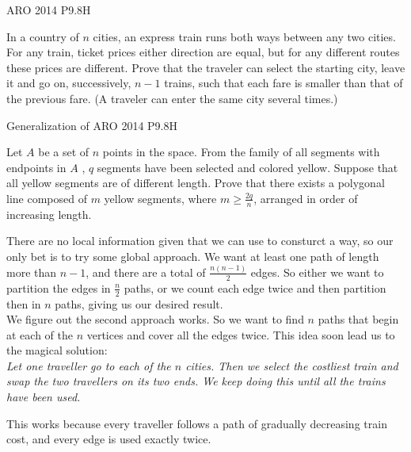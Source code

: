 

{ARO 2014 P9.8}{H}{
    In a country of $n$ cities, an express train runs both ways between any
    two cities. For any train, ticket prices either direction are equal, but
    for any different routes these prices are different. Prove that the
    traveler can select the starting city, leave it and go on, successively,
    $n-1$ trains, such that each fare is smaller than that of the previous
    fare. (A traveler can enter the same city several times.)

}

{Generalization of ARO 2014 P9.8}{H}{
    Let $ A $ be a set of $ n $ points in the space. From the family of all
    segments with endpoints in $ A $ , $ q $ segments have been selected and
    colored yellow. Suppose that all yellow segments are of different length.
    Prove that there exists a polygonal line composed of $ m $ yellow
    segments, where $ m\geq\frac{2q}{n}$, arranged in order of increasing
    length.

}


\begin{solution}
    There are no local information given that we can use to consturct a way,
    so our only bet is to try some global approach. We want at least one path
    of length more than $n-1$, and there are a total of $\frac{n(n-1)}{2}$
    edges. So either we want to partition the edges in $\frac{n}{2}$ paths, or
    we count each edge twice and then partition then in $n$ paths, giving us
    our desired result.\\

    We figure out the second approach works. So we want to find $n$ paths that
    begin at each of the $n$ vertices and cover all the edges twice. This idea
    soon lead us to the magical solution:\\

    \textit{\color{solC}Let one traveller go to each of the $n$ cities. Then we select the
    costliest train and swap the two travellers on its two ends. We keep doing
    this until all the trains have been used.\\}

    This works because every traveller follows a path of gradually decreasing
    train cost, and every edge is used exactly twice.
\end{solution} 

